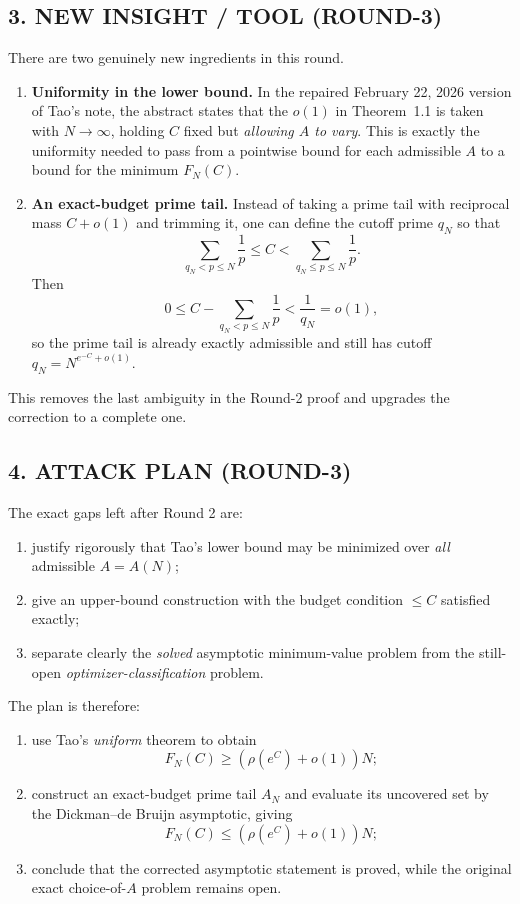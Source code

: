 \subsection*{3. NEW INSIGHT / TOOL (ROUND-3)}

There are two genuinely new ingredients in this round.

\begin{enumerate}
    \item \textbf{Uniformity in the lower bound.}  In the repaired February 22, 2026 version of Tao's note, the abstract states that the \(o(1)\) in Theorem~1.1 is taken with \(N\to\infty\), holding \(C\) fixed but \emph{allowing \(A\) to vary}.  This is exactly the uniformity needed to pass from a pointwise bound for each admissible \(A\) to a bound for the minimum \(F_N(C)\).
    \item \textbf{An exact-budget prime tail.}  Instead of taking a prime tail with reciprocal mass \(C+o(1)\) and trimming it, one can define the cutoff prime \(q_N\) so that
    \[
    \sum_{q_N<p\le N}\frac1p\le C<\sum_{q_N\le p\le N}\frac1p.
    \]
    Then
    \[
    0\le C-\sum_{q_N<p\le N}\frac1p<\frac1{q_N}=o(1),
    \]
    so the prime tail is already exactly admissible and still has cutoff \(q_N=N^{e^{-C}+o(1)}\).
\end{enumerate}

This removes the last ambiguity in the Round-2 proof and upgrades the correction to a complete one.

\subsection*{4. ATTACK PLAN (ROUND-3)}

The exact gaps left after Round 2 are:

\begin{enumerate}
    \item justify rigorously that Tao's lower bound may be minimized over \emph{all} admissible \(A=A(N)\);
    \item give an upper-bound construction with the budget condition \(\le C\) satisfied exactly;
    \item separate clearly the \emph{solved} asymptotic minimum-value problem from the still-open \emph{optimizer-classification} problem.
\end{enumerate}

The plan is therefore:

\begin{enumerate}
    \item use Tao's \emph{uniform} theorem to obtain
    \[
    F_N(C)\ge (\rho(e^C)+o(1))N;
    \]
    \item construct an exact-budget prime tail \(A_N\) and evaluate its uncovered set by the Dickman--de Bruijn asymptotic, giving
    \[
    F_N(C)\le (\rho(e^C)+o(1))N;
    \]
    \item conclude that the corrected asymptotic statement is proved, while the original exact choice-of-\(A\) problem remains open.
\end{enumerate}

